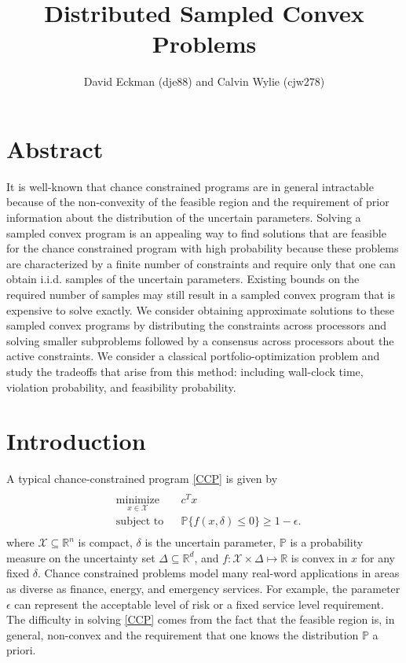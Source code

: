 \documentclass[12pt]{article}
\title{Distributed Sampled Convex Problems}
\author{David Eckman (dje88) and Calvin Wylie (cjw278)}
\date{}
\begin{document}
\setlength{\parindent}{24pt}

\maketitle

\section*{Abstract}
It is well-known that chance constrained programs are in general intractable because of the non-convexity of the feasible region and the requirement of prior information about the distribution of the uncertain parameters.
Solving a sampled convex program is an appealing way to find solutions that are feasible for the chance constrained program with high probability because these problems are characterized by a finite number of constraints and require only that one can obtain i.i.d. samples of the uncertain parameters.
Existing bounds on the required number of samples may still result in a sampled convex program that is expensive to solve exactly.
We consider obtaining approximate solutions to these sampled convex programs by distributing the constraints across processors and solving smaller subproblems followed by a consensus across processors about the active constraints.
We consider a classical portfolio-optimization problem and study the tradeoffs that arise from this method: including wall-clock time, violation probability, and feasibility probability.

\section*{Introduction}
A typical chance-constrained program \ref{CCP} is given by
\begin{align}\label{CCP}
\begin{split}
\begin{aligned}
    & \underset{x \in \mathcal{X}}{\text{minimize}}
    & & c^T x \\
    & \text{subject to}
    & & \mathbb{P}\{f(x,\delta) \leq 0\} \geq 1-\epsilon.
\end{aligned}
\end{split} \tag{CCP$_\epsilon$}
\end{align}
where $\mathcal{X} \subseteq \mathbb{R}^n$ is compact, $\delta$ is the uncertain parameter, $\mathbb{P}$ is a probability measure on the uncertainty set $\Delta \subseteq \mathbb{R}^d$, and $f:\mathcal{X} \times \Delta \mapsto \mathbb{R}$ is convex in $x$ for any fixed $\delta$.
Chance constrained problems model many real-word applications in areas as diverse as finance, energy, and emergency services.
For example, the parameter $\epsilon$ can represent the acceptable level of risk or a fixed service level requirement.
The difficulty in solving \ref{CCP} comes from the fact that the feasible region is, in general, non-convex and the requirement that one knows the distribution $\mathbb{P}$ a priori.
\end{document}
